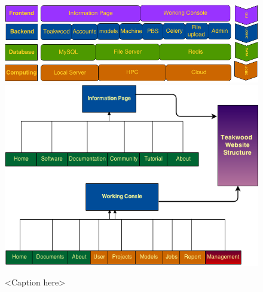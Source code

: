 \begin{figure}[htb]
\centering
\includegraphics[scale=0.5]{./system_structure} 
\includegraphics[scale=0.7]{./website_structure} %
\caption{<Caption here>}
\label{fig:label} %
\end{figure}

